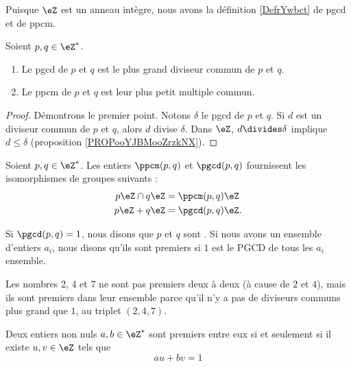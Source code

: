 Puisque \( \eZ\) est un anneau intègre, nous avons la définition \ref{DefrYwbct} de pgcd et de ppcm.
\begin{proposition}       \label{PROPooAVRGooUfhjwF}
	Soient \( p,q\in\eZ^*\).
	\begin{enumerate}
		\item
		      Le pgcd de \( p\) et \( q\) est le plus grand diviseur commun de \( p\) et \( q\).
		\item
		      Le ppcm de \( p\) et \( q\) est leur plus petit multiple commun.
	\end{enumerate}
\end{proposition}

\begin{proof}
	Démontrons le premier point. Notons \( \delta\) le pgcd de \( p\) et \( q\). Si \( d\) est un diviseur commun de \( p\) et \( q\), alors \( d\) divise \( \delta\). Dans \( \eZ\), \( d\divides \delta\) implique \( d\leq\delta\) (proposition \ref{PROPooYJBMooZrzkNX}).
\end{proof}

\begin{lemma}
	Soient \( p,q\in\eZ^*\). Les entiers \( \ppcm(p,q)\) et \( \pgcd(p,q)\) fournissent les isomorphismes de groupes suivants :
	\begin{subequations}
		\begin{align}
			p\eZ\cap q\eZ & =\ppcm(p,q)\eZ  \\
			p\eZ + q\eZ   & =\pgcd(p,q)\eZ.
		\end{align}
	\end{subequations}
\end{lemma}

\begin{definition}  \label{DefZHRXooNeWIcB}
	Si \( \pgcd(p,q)=1\), nous disons que \( p\) et \( q\) sont . Si nous avons un ensemble d'entiers \( a_i\), nous disons qu'ils sont premiers  si \( 1\) est le PGCD de tous les \( a_i\) ensemble.
\end{definition}

Les nombres \( 2\), \( 4\) et \( 7\) ne sont pas premiers deux à deux (à cause de \( 2\) et \( 4\)), mais ils sont premiers dans leur ensemble parce qu'il n'y a pas de diviseurs communs plus grand que \( 1\), au triplet \( (2, 4, 7)\).

\begin{theorem} \label{ThoBuNjam}
	Deux entiers non nuls \( a,b\in\eZ^*\) sont premiers entre eux si et seulement si il existe \( u,v\in\eZ\) tels que
	\begin{equation}
		au+bv=1
	\end{equation}
\end{theorem}

